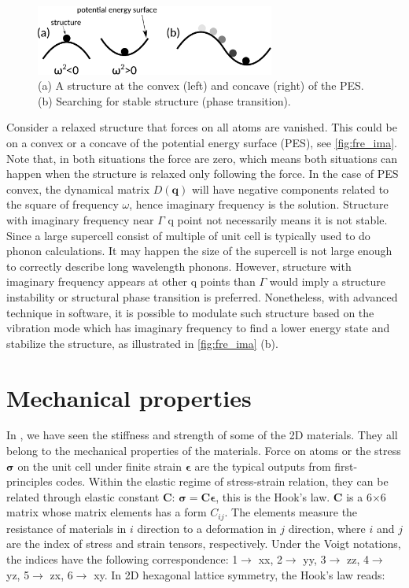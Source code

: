 \begin{figure}[htbp!] 
\centering  
\includegraphics[width=0.7\textwidth]{fre_ima.eps}
\caption{ (a) A structure at the convex (left) and concave (right) of the PES. (b) Searching for stable structure (phase transition).}  
\label{fig:fre_ima}
\end{figure} 

Consider a relaxed structure that forces on all atoms are vanished. This could be on a convex or a concave of the potential energy surface (PES), see \autoref{fig:fre_ima}. Note that, in both situations the force are zero, which means both situations can happen when the structure is relaxed only following the force. In the case of PES convex, the dynamical matrix $D(\mathbf{q})$ will have negative components related to the square of frequency $\omega$, hence imaginary frequency is the solution. Structure with imaginary frequency near $\Gamma$ q point not necessarily means it is not stable. Since a large supercell consist of multiple of unit cell is typically used to do phonon calculations. It may happen the size of the supercell is not large enough to correctly describe long wavelength phonons. However, structure with imaginary frequency appears at other q points than $\Gamma$ would imply a structure instability or structural phase transition is preferred. Nonetheless, with advanced technique in software\cite{Togo20151}, it is possible to modulate such structure based on the vibration mode which has imaginary frequency to find a lower energy state and stabilize the structure, as illustrated in \autoref{fig:fre_ima} (b).



\section{Mechanical properties}

In , we have seen the stiffness and strength of some of the 2D materials. They all belong to the mechanical properties of the materials. Force on atoms or the stress $\boldsymbol{\sigma}$ on the unit cell under finite strain $\boldsymbol{\epsilon}$ are the typical outputs from first-principles codes. Within the elastic regime of stress-strain relation, they can be related through elastic constant $\boldsymbol{C}$: $\boldsymbol{\sigma}=\boldsymbol{C}\boldsymbol{\epsilon}$, this is the Hook's law. $\boldsymbol{C}$ is a 6$\times$6 matrix whose matrix elements has a form $C_{ij}$. The elements measure the resistance of materials in $i$ direction to a deformation in $j$ direction, where $i$ and $j$ are the index of stress and strain tensors, respectively.  Under the Voigt notations, the indices have the following correspondence: 1$\rightarrow$ xx, 2$\rightarrow$ yy, 3$\rightarrow$ zz, 4$\rightarrow$ yz, 5$\rightarrow$ zx, 6$\rightarrow$ xy. In 2D hexagonal lattice symmetry, the Hook's law reads:

